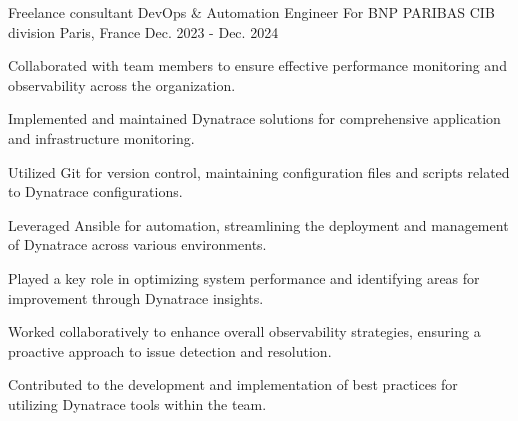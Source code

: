 

\begin{cventries}


\cventry
{Freelance consultant DevOps \& Automation Engineer} %
{For BNP PARIBAS CIB division} %
{Paris, France} %
{Dec. 2023 - Dec. 2024} %
{
  \begin{cvitems} %
    \item {Collaborated with team members to ensure effective performance monitoring and observability across the organization.}
    \item {Implemented and maintained Dynatrace solutions for comprehensive application and infrastructure monitoring.}
    \item {Utilized Git for version control, maintaining configuration files and scripts related to Dynatrace configurations.}
    \item {Leveraged Ansible for automation, streamlining the deployment and management of Dynatrace across various environments.}
    \item {Played a key role in optimizing system performance and identifying areas for improvement through Dynatrace insights.}
    \item {Worked collaboratively to enhance overall observability strategies, ensuring a proactive approach to issue detection and resolution.}
    \item {Contributed to the development and implementation of best practices for utilizing Dynatrace tools within the team.}
  \end{cvitems}
}


\end{cventries}
